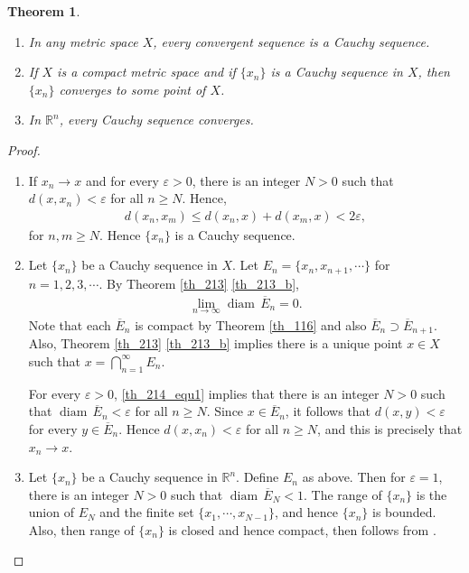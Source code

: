 \documentclass[11pt]{book}
\newtheorem{theorem}{Theorem}[chapter]
\theoremstyle{definition}
\numberwithin{equation}{chapter}
\def\diam{{\operatorname{diam}\,}}
\begin{document}
\begin{theorem}\label{th_214}
~\begin{enumerate}[label=(\alph*)]
    \item In any metric space $X$, every convergent sequence is a Cauchy sequence. \label{th_214_a}
    
    \item If $X$ is a compact metric space and if $\{x_n\}$ is a Cauchy sequence in $X$, then $\{x_n\}$ converges to some point of $X$. \label{th_214_b}
    
    \item In $\mathbb{R}^n$, every Cauchy sequence converges. \label{th_214_c}
\end{enumerate}
\end{theorem}
\begin{proof}
~\begin{enumerate}[label=(\alph*)]
    \item If $x_n \to x$ and for every $\varepsilon > 0$, there is an integer $N > 0$ such that $d(x,x_n) < \varepsilon$ for all $n \geq N$. Hence, 
    \begin{align*}
        d(x_n,x_m) \leq d(x_n,x) + d(x_m,x) < 2 \varepsilon,
    \end{align*}
    for $n,m \geq N$. Hence $\{x_n\}$ is a Cauchy sequence.
    
    \item Let $\{x_n\}$ be a Cauchy sequence in $X$. Let $E_n = \{x_n, x_{n+1}, \cdots\}$ for $n = 1,2,3,\cdots$. By Theorem \ref{th_213} \ref{th_213_b}, \begin{align}\label{th_214_equ1}
        \lim_{n\to\infty} \diam \overline{E}_n = 0.
    \end{align}
    Note that each $\overline{E}_n$ is compact by Theorem \ref{th_116} and also $\overline{E}_n \supset \overline{E}_{n+1}$. Also, Theorem \ref{th_213} \ref{th_213_b} implies there is a unique point $x \in X$ such that $x = \bigcap^\infty_{n=1} E_n$. 
    
    For every $\varepsilon > 0$, \eqref{th_214_equ1} implies that there is an integer $N > 0$ such that $\diam \overline{E}_n < \varepsilon$ for all $n \geq N$. Since $x \in \overline{E}_n$, it follows that $d(x,y) < \varepsilon$ for every $y \in \overline{E}_n$. Hence $d(x,x_n) < \varepsilon$ for all $n \geq N$, and this is precisely that $x_n \to x$. 
    
    \item Let $\{x_n\}$ be a Cauchy sequence in $\mathbb{R}^n$. Define $E_n$ as above. Then for $\varepsilon = 1$, there is an integer $N > 0$ such that $\diam \overline{E}_N < 1$. The range of $\{x_n\}$ is the union of $E_N$ and the finite set $\{x_1, \cdots, x_{N-1}\}$, and hence $\{x_n\}$ is bounded. Also, then range of $\{x_n\}$ is closed and hence compact, then \label{th_214_c} follows from \label{th_214_b}.
\end{enumerate}
\end{proof}
\end{document}
